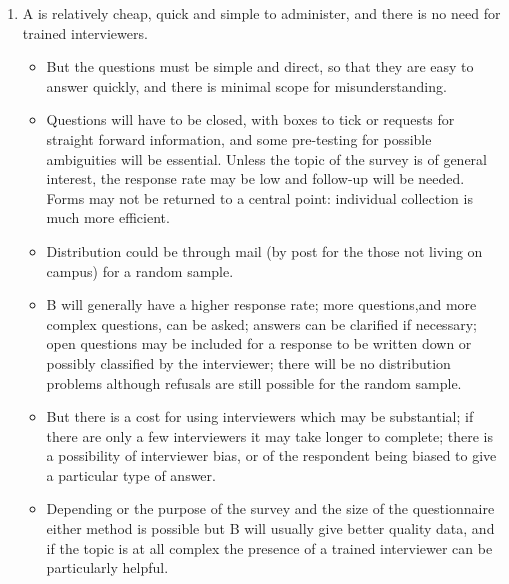\documentclass[a4paper,12pt]{article}
\begin{document}
\begin{enumerate}
\item A is relatively cheap, quick and simple to administer, and there is no need for trained
interviewers.
\begin{itemize}
    \item But the questions must be simple and direct, so that they are easy to answer quickly,
and there is minimal scope for misunderstanding.
\item Questions will have to be closed,
with boxes to tick or requests for straight forward information, and some pre-testing for
possible ambiguities will be essential. Unless the topic of the survey is of general interest,
the response rate may be low and follow-up will be needed. Forms may not be returned
to a central point: individual collection is much more efficient. \item Distribution could be
through mail (by post for the those not living on campus) for a random sample.
\item B will generally have a higher response rate; more questions,and more complex questions,
can be asked; answers can be clarified if necessary; open questions may be included for
a response to be written down or possibly classified by the interviewer; there will be no
distribution problems although refusals are still possible for the random sample.
\item But
there is a cost for using interviewers which may be substantial; if there are only a few
interviewers it may take longer to complete; there is a possibility of interviewer bias, or
of the respondent being biased to give a particular type of answer.
\item Depending or the purpose of the survey and the size of the questionnaire either method
is possible but B will usually give better quality data, and if the topic is at all complex
the presence of a trained interviewer can be particularly helpful.
\end{itemize}


\end{enumerate}
\end{document}

